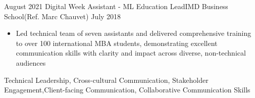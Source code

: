 \begin{experiences}
  \emptySeparator
\experience
    {August 2021}   {Digital Week Assistant - ML Education Lead}{IMD Business School}{(Ref. Marc Chauvet)}
    {July 2018} {
                      \begin{itemize}
                        \item Led technical team of seven assistants and delivered comprehensive training to over 100 international MBA students, demonstrating excellent communication skills with clarity and impact across diverse, non-technical audiences
                      \end{itemize}
                    }
                    {Technical Leadership, Cross-cultural Communication, Stakeholder Engagement,Client-facing Communication, Collaborative Communication Skills}
  \emptySeparator
\end{experiences}
